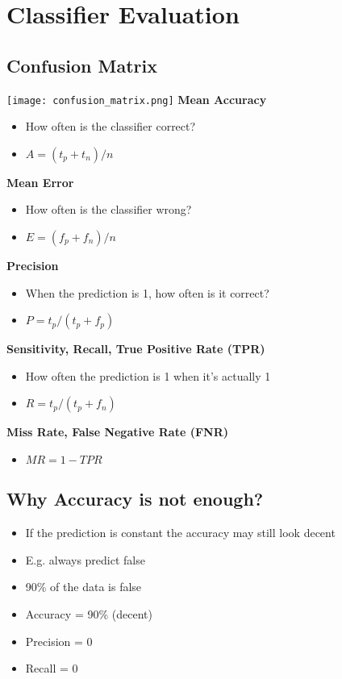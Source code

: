 \section{Classifier Evaluation}
\subsection{Confusion Matrix}
\texttt{[image: confusion\_matrix.png]}
\textbf{Mean Accuracy}
\begin{itemize}
    \item How often is the classifier correct?
    \item $A = (t_p + t_n) / n$
\end{itemize}
\textbf{Mean Error}
\begin{itemize}
    \item How often is the classifier wrong?
    \item $E = (f_p + f_n) / n$
\end{itemize}
\textbf{Precision}
\begin{itemize}
    \item When the prediction is 1, how often is it correct?
    \item $P = t_p / (t_p + f_p)$
\end{itemize}
\textbf{Sensitivity, Recall, True Positive Rate (TPR)}
\begin{itemize}
    \item How often the prediction is 1 when it's actually 1
    \item $R = t_p / (t_p + f_n)$
\end{itemize}
\textbf{Miss Rate, False Negative Rate (FNR)}
\begin{itemize}
    \item $MR = 1 - TPR$
\end{itemize}

\subsection{Why Accuracy is not enough?}
\begin{itemize}
    \item If the prediction is constant the accuracy may still look decent
    \item E.g. always predict false
    \item 90\% of the data is false
    \item Accuracy = 90\% (decent)
    \item Precision = 0
    \item Recall = 0
\end{itemize}


